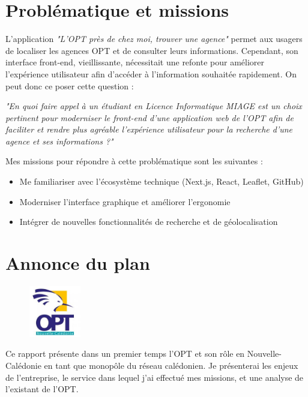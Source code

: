 \documentclass[12pt,a4paper]{report}
\begin{document}
\section{Problématique et missions}
L’application \textit{"L'OPT près de chez moi, trouver une agence"} permet aux usagers de localiser les agences OPT et de consulter leurs informations. Cependant, son interface front-end, vieillissante, nécessitait une refonte pour améliorer l’expérience utilisateur afin d'accéder à l'information souhaitée rapidement. On peut donc ce poser cette question :

\vspace{1cm}

\textit{"En quoi faire appel à un étudiant en Licence Informatique MIAGE est un choix pertinent pour moderniser le front-end d'une application web de l'OPT afin de faciliter et rendre plus agréable l'expérience utilisateur pour la recherche d'une agence et ses informations ?"}

\vspace{1cm}
Mes missions pour répondre à cette problématique sont les suivantes :  
\begin{itemize}
    \item Me familiariser avec l’écosystème technique (Next.js, React, Leaflet, GitHub)
    \item Moderniser l’interface graphique et améliorer l’ergonomie
    \item Intégrer de nouvelles fonctionnalités de recherche et de géolocalisation
\end{itemize}
\newpage

\section{Annonce du plan}
\begin{figure}[h] %
    \centering
    \includegraphics[width=0.2\textwidth]{ressources_rapport/logo_opt.jpg}
\end{figure}
Ce rapport présente dans un premier temps l’OPT et son rôle en Nouvelle-Calédonie en tant que monopôle du réseau calédonien. Je présenterai les enjeux de l'entreprise, le service dans lequel j'ai effectué mes missions, et une analyse de l'existant de l'OPT.
\end{document}
